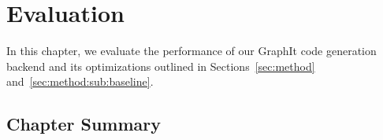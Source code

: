 \chapter{Evaluation}

In this chapter, we evaluate the performance of our GraphIt code generation backend and its optimizations outlined in Sections~\ref{sec:method} and~\ref{sec:method:sub:baseline}.




\section{Chapter Summary}